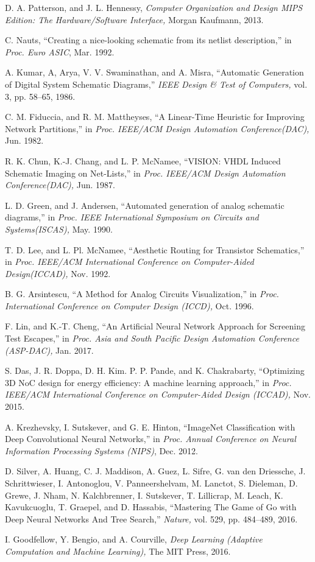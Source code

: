 \documentclass[twocolumn]{article}
\begin{document}
\begin{thebibliography}{99}
\footnotesize

D. A. Patterson, and J. L. Hennessy,
{\em Computer Organization and Design MIPS Edition:
 The Hardware/Software Interface,}
Morgan Kaufmann, 2013.

C. Nauts,
``Creating a nice-looking schematic from its netlist description,''
in {\em Proc. Euro ASIC}, Mar. 1992.

A. Kumar, A, Arya, V. V. Swaminathan, and A. Misra,
``Automatic Generation of Digital System Schematic Diagrams,''
{\em IEEE Design \& Test of Computers,}
vol. 3, pp. 58--65, 1986.

C. M. Fiduccia, and R. M. Mattheyses,
``A Linear-Time Heuristic for Improving Network Partitions,''
in {\em Proc. IEEE/ACM Design Automation Conference(DAC),}
Jun. 1982.

R. K. Chun, K.-J. Chang, and L. P. McNamee,
``VISION: VHDL Induced Schematic Imaging on Net-Lists,''
in {\em Proc. IEEE/ACM Design Automation Conference(DAC),}
Jun. 1987.

L. D. Green, and J. Andersen,
``Automated generation of analog schematic diagrams,''
in {\em Proc. IEEE International Symposium on Circuits and Systems(ISCAS),}
May. 1990.

T. D. Lee, and L. Pl. McNamee,
``Aesthetic Routing for Transistor Schematics,''
in {\em Proc. IEEE/ACM International Conference
 on Computer-Aided Design(ICCAD),}
Nov. 1992.

B. G. Arsintescu,
``A Method for Analog Circuits Visualization,''
in {\em Proc. International Conference on Computer Design (ICCD),}
Oct. 1996.

F. Lin, and K.-T. Cheng,
``An Artificial Neural Network Approach for Screening Test Escapes,''
in {\em Proc. Asia and South Pacific Design Automation Conference (ASP-DAC),}
Jan. 2017.

S. Das, J. R. Doppa, D. H. Kim. P. P. Pande, and K. Chakrabarty,
``Optimizing 3D NoC design for energy efficiency:
 A machine learning approach,''
in {\em Proc. IEEE/ACM International Conference on
 Computer-Aided Design (ICCAD),}
Nov. 2015.

A. Krezhevsky, I. Sutskever, and G. E. Hinton,
``ImageNet Classification with Deep Convolutional Neural Networks,''
in {\em Proc. Annual Conference on Neural Information Processing Systems (NIPS)},
Dec. 2012.


D. Silver, A. Huang, C. J. Maddison, A. Guez, L. Sifre, G. van den Driessche,
J. Schrittwieser, I. Antonoglou, V. Panneershelvam, M. Lanctot, S. Dieleman,
D. Grewe, J. Nham, N. Kalchbrenner, I. Sutskever, T. Lillicrap, M. Leach,
K. Kavukcuoglu, T. Graepel, and D. Hassabis,
``Mastering The Game of Go with Deep Neural Networks And Tree Search,''
{\em Nature,} vol. 529, pp. 484--489, 2016.

I. Goodfellow, Y. Bengio, and A. Courville,
{\em Deep Learning (Adaptive Computation and Machine Learning),}
The MIT Press, 2016. 

\end{thebibliography}
\end{document}
